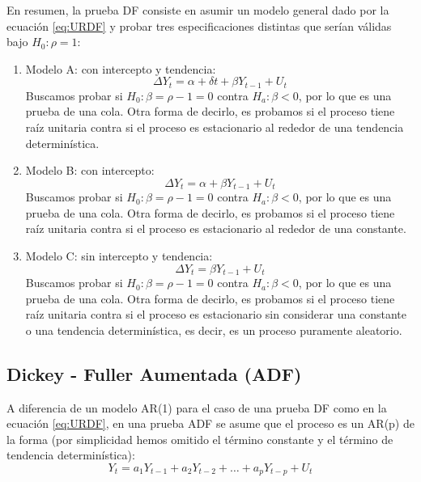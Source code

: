 \documentclass[
]{book}
\begin{document}
En resumen, la prueba DF consiste en asumir un modelo general dado por la ecuación \eqref{eq:URDF} y probar tres especificaciones distintas que serían válidas bajo \(H_0 : \rho = 1\):

\begin{enumerate}
\def\labelenumi{\arabic{enumi}.}
\item
  Modelo A: con intercepto y tendencia:
  \begin{equation*}
   \Delta Y_t = \alpha + \delta t + \beta Y_{t-1} + U_t
    \end{equation*}
  Buscamos probar si \(H_0 : \beta = \rho - 1 = 0\) contra \(H_a : \beta < 0\), por lo que es una prueba de una cola. Otra forma de decirlo, es probamos si el proceso tiene raíz unitaria contra si el proceso es estacionario al rededor de una tendencia determinística.
\item
  Modelo B: con intercepto:
  \begin{equation*}
   \Delta Y_t = \alpha + \beta Y_{t-1} + U_t
    \end{equation*}
  Buscamos probar si \(H_0 : \beta = \rho - 1 = 0\) contra \(H_a : \beta < 0\), por lo que es una prueba de una cola. Otra forma de decirlo, es probamos si el proceso tiene raíz unitaria contra si el proceso es estacionario al rededor de una constante.
\item
  Modelo C: sin intercepto y tendencia:
  \begin{equation*}
   \Delta Y_t = \beta Y_{t-1} + U_t
    \end{equation*}
  Buscamos probar si \(H_0 : \beta = \rho - 1 = 0\) contra \(H_a : \beta < 0\), por lo que es una prueba de una cola. Otra forma de decirlo, es probamos si el proceso tiene raíz unitaria contra si el proceso es estacionario sin considerar una constante o una tendencia determinística, es decir, es un proceso puramente aleatorio.
\end{enumerate}

\hypertarget{dickey---fuller-aumentada-adf}{%
\subsection{Dickey - Fuller Aumentada (ADF)}\label{dickey---fuller-aumentada-adf}}

A diferencia de un modelo AR(1) para el caso de una prueba DF como en la ecuación \eqref{eq:URDF}, en una prueba ADF se asume que el proceso es un AR(p) de la forma (por simplicidad hemos omitido el término constante y el término de tendencia determinística):
\begin{equation}
    Y_t = a_1 Y_{t-1} + a_2 Y_{t-2} + \ldots + a_p Y_{t-p} + U_t
    \label{eq:URADF}
\end{equation}
\end{document}
